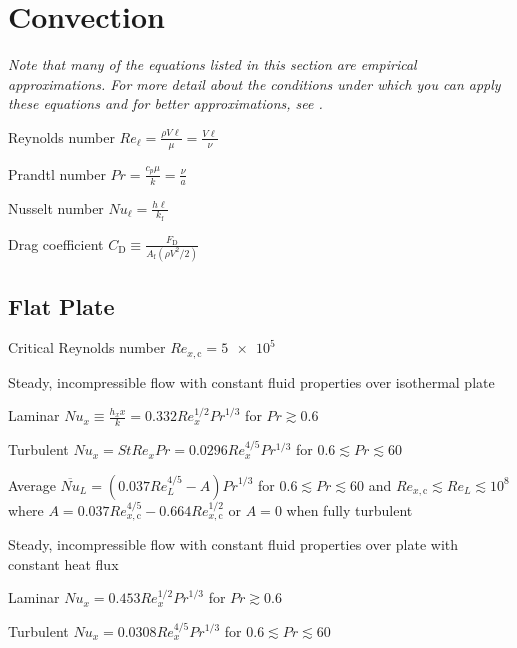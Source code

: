 \documentclass{article}
\begin{document}
\section{Convection}
\label{sec:convection}

\emph{Note that many of the equations listed in this section are empirical approximations. For more
  detail about the conditions under which you can apply these equations and for better
  approximations, see \cite{hamt}.}

\begin{description*}
\item[Reynolds number]
  \(\mathit{Re}_\ell = \frac{\rho{}V\ell}{\mu} = \frac{V\ell}{\nu}\)
\item[Prandtl number]
  \(\mathit{Pr} = \frac{c_p\mu}{k} = \frac{\nu}{a}\)
\item[Nusselt number]
  \(\mathit{Nu}_\ell = \frac{h\ell}{k_\mathrm{f}}\)
\item[Drag coefficient]
  \(C_\mathrm{D} \equiv \frac{F_\mathrm{D}}{A_\mathrm{f}(\rho V^2/2)}\)
\end{description*}

\subsection{Flat Plate}
\begin{description*}
\item[Critical Reynolds number]
  \(\mathit{Re}_{x,\mathrm{c}} = \num{5e5}\)
\item[Steady, incompressible flow with constant fluid properties over isothermal plate]~
  \begin{description*}
  \item[Laminar]
    \(\mathit{Nu}_x \equiv \frac{h_xx}{k} = 0.332\mathit{Re}_x^{1/2}\mathit{Pr}^{1/3}\) for
    \(\mathit{Pr} \gtrsim 0.6\)
  \item[Turbulent]
    \(\mathit{Nu}_x = \mathit{St}\mathit{Re}_x\mathit{Pr} = 0.0296\mathit{Re}_x^{4/5}Pr^{1/3}\) for
    \(0.6 \lesssim \mathit{Pr} \lesssim 60\)
  \item[Average]
    \(\overline{\mathit{Nu}}_L = (0.037\mathit{Re}_L^{4/5} - A)\mathit{Pr}^{1/3}\) for
    \(0.6 \lesssim \mathit{Pr} \lesssim 60\) and \(\mathit{Re}_{x,\mathrm{c}} \lesssim Re_L \lesssim 10^8\) where
    \(A = 0.037\mathit{Re}_{x,\mathrm{c}}^{4/5} - 0.664\mathit{Re}_{x,\mathrm{c}}^{1/2}\)
    or \(A = 0\) when fully turbulent
  \end{description*}
\item[Steady, incompressible flow with constant fluid properties over plate with constant heat flux]~
  \begin{description*}
  \item[Laminar]
    \(\mathit{Nu}_x = 0.453\mathit{Re}_x^{1/2}\mathit{Pr}^{1/3}\) for \(\mathit{Pr} \gtrsim 0.6\)
  \item[Turbulent]
    \(\mathit{Nu}_x = 0.0308\mathit{Re}_x^{4/5}\mathit{Pr}^{1/3}\) for \(0.6 \lesssim \mathit{Pr} \lesssim 60\)
  \end{description*}
\end{description*}
\end{document}
